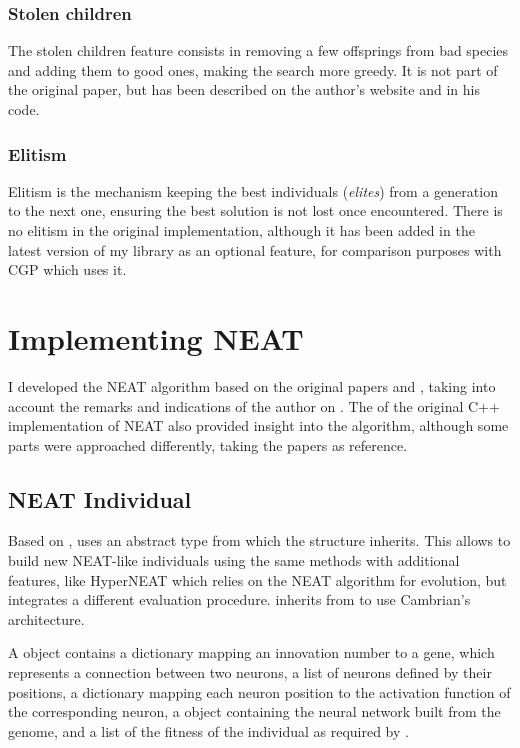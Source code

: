 \subsubsection{Stolen children}
The stolen children feature consists in removing a few offsprings from bad species and adding them to good ones, making the search more greedy. It is not part of the original paper, but has been described on the author's website and in his code.

\subsubsection{Elitism}
\label{subsec:elitism}
Elitism is the mechanism keeping the best individuals (\textit{elites}) from a generation to the next one, ensuring the best solution is not lost once encountered. There is no elitism in the original implementation, although it has been added in the latest version of my library as an optional feature, for comparison purposes with CGP which uses it.

\section{Implementing NEAT}
I developed the NEAT algorithm based on the original papers \cite{NEAT_1} and \cite{NEAT_2}, taking into account the remarks and indications of the author on . The  of the original C++ implementation of NEAT also provided insight into the algorithm, although some parts were approached differently, taking the papers as reference.

\subsection{NEAT Individual}

Based on ,  uses an abstract type  from which the structure  inherits. This allows to build new NEAT-like individuals using the same methods with additional features, like HyperNEAT which relies on the NEAT algorithm for evolution, but integrates a different evaluation procedure.  inherits from  to use Cambrian's architecture.

A  object contains a dictionary mapping an innovation number to a gene, which represents a connection between two neurons, a list of neurons defined by their positions, a dictionary mapping each neuron position to the activation function of the corresponding neuron, a  object containing the neural network built from the genome, and a list of the fitness of the individual as required by .

